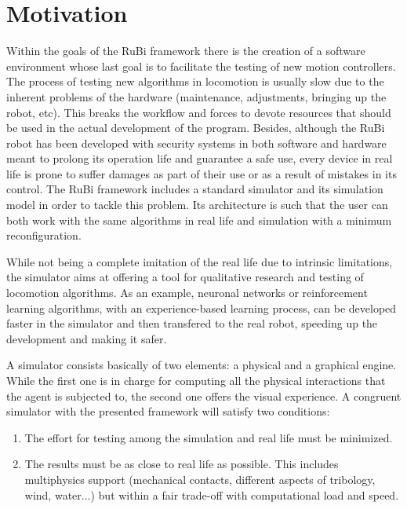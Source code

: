 \section{Motivation} %
\label{sec:sim_motivation}
Within the goals of the RuBi framework there is the creation of a software environment whose last goal is to facilitate the testing of new motion controllers.
The process of testing new algorithms in locomotion is usually slow due to the inherent problems of the hardware (maintenance, adjustments, bringing up the robot, etc).
This breaks the workflow and forces to devote resources that should be used in the actual development of the program.
Besides, although the RuBi robot has been developed with security systems in both software and hardware meant to prolong its operation life and guarantee a safe use, every device in real life is prone to suffer damages as part of their use or as a result of mistakes in its control.
The RuBi framework includes a standard simulator and its simulation model in order to tackle this problem.
Its architecture is such that the user can both work with the same algorithms in real life and simulation with a minimum reconfiguration.

While not being a complete imitation of the real life due to intrinsic limitations, the simulator aims at offering a tool for qualitative research and testing of locomotion algorithms.
As an example, neuronal networks or reinforcement learning algorithms, with an experience-based learning process, can be developed faster in the simulator and then transfered to the real robot, speeding up the development and making it safer.

A simulator consists basically of two elements: a physical and a graphical engine.
While the first one is in charge for computing all the physical interactions that the agent is subjected to, the second one offers the visual experience.
A congruent simulator with the presented framework will satisfy two conditions:
\begin{enumerate}
  \item The effort for testing among the simulation and real life must be minimized.
  \item The results must be as close to real life as possible. This includes multiphysics support (mechanical contacts, different aspects of tribology, wind, water...) but within a fair trade-off with computational load and speed.
\end{enumerate}

